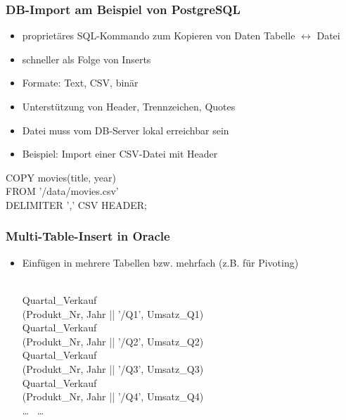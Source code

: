 
\begin{frame}

    \frametitle{DB-Import am Beispiel von PostgreSQL}
    
    \begin{itemize}
      \item proprietäres SQL-Kommando zum Kopieren von Daten  Tabelle $\leftrightarrow$ Datei
      \item schneller als Folge von Inserts
      \item Formate: Text, CSV, binär
      \item Unterstützung von Header, Trennzeichen, Quotes
      \item Datei muss vom DB-Server lokal erreichbar sein 
      \item Beispiel: Import einer CSV-Datei mit Header
    \end{itemize}

    \begin{sql}    
    COPY movies(title, year) \\
    \1 FROM '/data/movies.csv' \\
    \1 DELIMITER ',' CSV HEADER;
    \end{sql}
\end{frame}


\begin{frame}

    \frametitle{Multi-Table-Insert in Oracle}
    
    \begin{itemize}
    \item Einfügen in mehrere Tabellen bzw. mehrfach (z.B. für Pivoting)
    
    \hspace*{-1cm}\begin{sql}
     \\
     Quartal\_Verkauf \\
    \1  (Produkt\_Nr, Jahr || '/Q1', Umsatz\_Q1) \\
     Quartal\_Verkauf \\
    \1  (Produkt\_Nr, Jahr || '/Q2', Umsatz\_Q2) \\
     Quartal\_Verkauf \\
    \1  (Produkt\_Nr, Jahr || '/Q3', Umsatz\_Q3) \\
     Quartal\_Verkauf \\
    \1  (Produkt\_Nr, Jahr || '/Q4', Umsatz\_Q4) \\
     \dots\  \dots
    \end{sql}
    \end{itemize}
    
    \end{frame}
    
